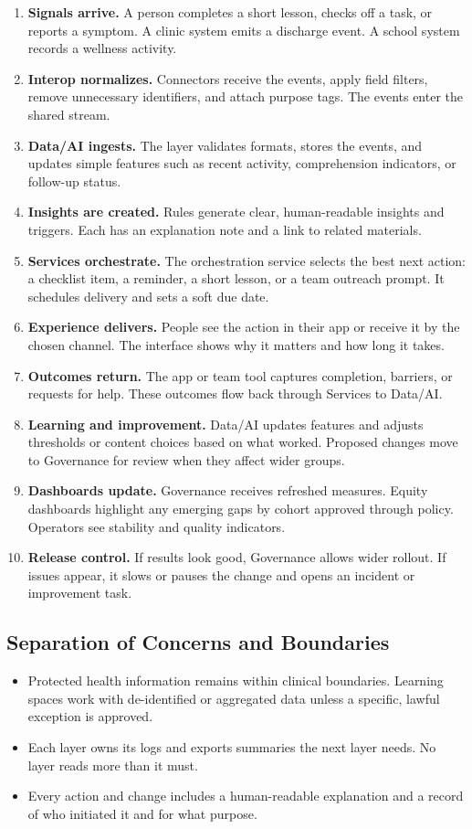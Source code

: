 \documentclass[12pt]{article}
\begin{document}
\begin{enumerate}[leftmargin=*]
  \item \textbf{Signals arrive.} A person completes a short lesson, checks off a task, or reports a symptom. A clinic system emits a discharge event. A school system records a wellness activity.
  \item \textbf{Interop normalizes.} Connectors receive the events, apply field filters, remove unnecessary identifiers, and attach purpose tags. The events enter the shared stream.
  \item \textbf{Data/AI ingests.} The layer validates formats, stores the events, and updates simple features such as recent activity, comprehension indicators, or follow-up status.
  \item \textbf{Insights are created.} Rules generate clear, human-readable insights and triggers. Each has an explanation note and a link to related materials.
  \item \textbf{Services orchestrate.} The orchestration service selects the best next action: a checklist item, a reminder, a short lesson, or a team outreach prompt. It schedules delivery and sets a soft due date.
  \item \textbf{Experience delivers.} People see the action in their app or receive it by the chosen channel. The interface shows why it matters and how long it takes.
  \item \textbf{Outcomes return.} The app or team tool captures completion, barriers, or requests for help. These outcomes flow back through Services to Data/AI.
  \item \textbf{Learning and improvement.} Data/AI updates features and adjusts thresholds or content choices based on what worked. Proposed changes move to Governance for review when they affect wider groups.
  \item \textbf{Dashboards update.} Governance receives refreshed measures. Equity dashboards highlight any emerging gaps by cohort approved through policy. Operators see stability and quality indicators.
  \item \textbf{Release control.} If results look good, Governance allows wider rollout. If issues appear, it slows or pauses the change and opens an incident or improvement task.
\end{enumerate}

\subsection*{Separation of Concerns and Boundaries}
\begin{itemize}[leftmargin=*]
  \item Protected health information remains within clinical boundaries. Learning spaces work with de-identified or aggregated data unless a specific, lawful exception is approved.
  \item Each layer owns its logs and exports summaries the next layer needs. No layer reads more than it must.
  \item Every action and change includes a human-readable explanation and a record of who initiated it and for what purpose.
\end{itemize}
\end{document}

